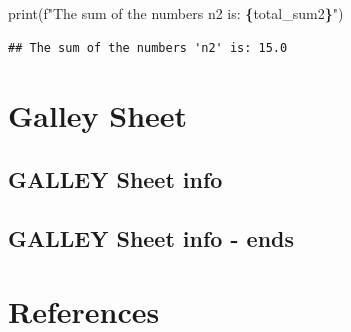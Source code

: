 \documentclass[
  12 pt,
  a4paper,
]{book}
\newenvironment{Shaded}{\begin{snugshade}}{\end{snugshade}}
\newcommand{\BuiltInTok}[1]{#1}
\newcommand{\NormalTok}[1]{#1}
\newcommand{\SpecialCharTok}[1]{\textcolor[rgb]{0.81,0.36,0.00}{\textbf{#1}}}
\newcommand{\SpecialStringTok}[1]{\textcolor[rgb]{0.31,0.60,0.02}{#1}}
\numberwithin{equation}{section}
\theoremstyle{plain}      %
\theoremstyle{definition} %
\theoremstyle{remark}     %
\theoremstyle{note}         %
\begin{document}
\begin{Shaded}
\begin{Highlighting}[]
\BuiltInTok{print}\NormalTok{(}\SpecialStringTok{f"The sum of the numbers \textquotesingle{}n2\textquotesingle{} is: }\SpecialCharTok{\{}\NormalTok{total\_sum2}\SpecialCharTok{\}}\SpecialStringTok{"}\NormalTok{)}
\end{Highlighting}
\end{Shaded}

\begin{verbatim}
## The sum of the numbers 'n2' is: 15.0
\end{verbatim}

\newpage

\listoffigures
\lstlistoflistings

\newpage

\hypertarget{galley-sheet}{%
\chapter*{Galley Sheet}\label{galley-sheet}}

\hypertarget{galley-sheet-info}{%
\section{\texorpdfstring{\textbf{GALLEY Sheet
info}}{GALLEY Sheet info}}\label{galley-sheet-info}}

\layout

\hypertarget{galley-sheet-info---ends}{%
\section{\texorpdfstring{\textbf{GALLEY Sheet info -
ends}}{GALLEY Sheet info - ends}}\label{galley-sheet-info---ends}}

\newpage

\hypertarget{references}{%
\chapter{References}\label{references}}

\backmatter
\end{document}
